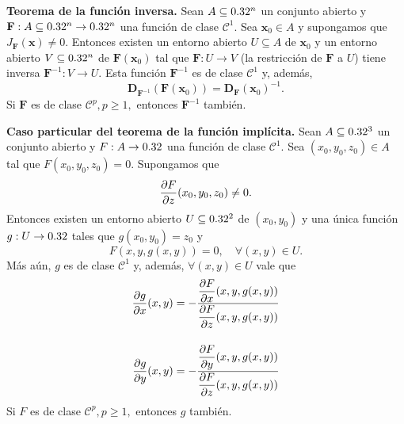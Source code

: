 
\begin{theorem}\textbf{Teorema de la funci\'on inversa.} \label{teo:inversa}  Sean $A  \subseteq  0.32^n$ un conjunto abierto y $\mathbf{F}: A  \subseteq  0.32^n \to 0.32^n$ una funci\'on de clase $\mathcal{C}^1$. Sea $\mathbf{x}_0 \in A$ y supongamos que $J_\mathbf{F}(\mathbf{x}) \ne 0$. Entonces existen un entorno abierto $U  \subseteq  A$ de $\mathbf{x}_0$ y un entorno abierto $V  \subseteq  0.32^n$ de $\mathbf{F}(\mathbf{x}_0)$ tal que $\mathbf{F}:U \to V$ (la restricci\'on de $\mathbf{F}$ a $U$) tiene inversa $\mathbf{F}^{-1}:V \to U$. Esta funci\'on $\mathbf{F}^{-1}$ es de clase $\mathcal{C}^1$ y, adem\'as,
 \[
  \boldsymbol{D}_{\mathbf{F}^{-1}}{(\mathbf{F}(\mathbf{x}_0))} = \boldsymbol{D}_\mathbf{F}{(\mathbf{x}_0)}^{-1}.
 \]
 Si $\mathbf{F}$ es de clase $\mathcal{C}^p, p \ge 1,$ entonces $\mathbf{F}^{-1}$ tambi\'en.
\end{theorem}

\begin{theorem}\textbf{Caso particular del teorema de la funci\'on impl\'icita.} \label{teo:implicit_part} Sean $A  \subseteq  0.32^3$ un conjunto abierto y $F: A \to 0.32$ una funci\'on de clase $\mathcal{C}^1$. Sea $(x_0,y_0,z_0) \in A$ tal que $F(x_0,y_0,z_0) = 0$. Supongamos que 
 \[
    \dfrac{\partial F}{\partial z} (x_0,y_0,z_0) \ne 0.
 \]
 Entonces existen un entorno abierto $U  \subseteq  0.32^2$ de $(x_0,y_0)$
 y una \'unica funci\'on $g: U \to 0.32$ tales que $g(x_0,y_0) = z_0$ y
 \[
  F(x,y,g(x,y)) = 0,\quad \forall (x,y) \in U.
 \]
 M\'as a\'un, $g$ es de clase $\mathcal{C}^1$ y, adem\'as, $\forall (x,y) \in U$ vale que
 \begin{align*}
  \dfrac{\partial g}{\partial x}(x,y) &= -\frac{\dfrac{\partial F}{\partial x} (x,y,g(x,y))}{\dfrac{\partial F}{\partial z} (x,y,g(x,y))}  \\[.4cm]
  \dfrac{\partial g}{\partial y}(x,y) &= -\frac{\dfrac{\partial F}{\partial y} (x,y,g(x,y))}{\dfrac{\partial F}{\partial z} (x,y,g(x,y))} \\
 \end{align*}
 Si $F$ es de clase $\mathcal{C}^p, p \ge 1,$ entonces $g$ tambi\'en.
\end{theorem}


